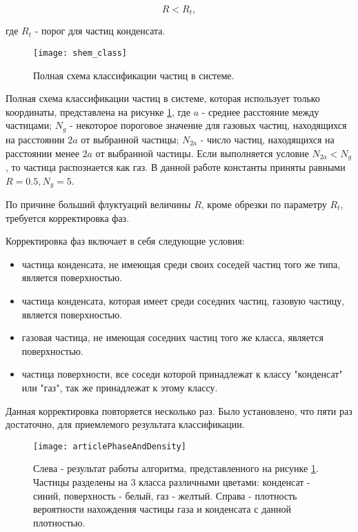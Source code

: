 \begin{equation}
R < R_t,
\end{equation}

где $R_t$ - порог для частиц конденсата.

\begin{figure}[h]
\begin{center}
\texttt{[image: shem\_class]}
\caption{Полная схема классификации частиц в системе.}
\label{risShemClass}
\end{center}
\end{figure}

Полная схема классификации частиц в системе, которая использует только координаты, представлена на рисунке \ref{risShemClass},
где $a$ - среднее расстояние между частицами; $N_g$ - некоторое пороговое значение для газовых частиц, находящихся на расстоянии $2a$ от выбранной частицы; $N_{2a}$ - число частиц, находящихся на расстоянии менее $2a$ от выбранной частицы. Если выполняется условие $N_{2a} < N_{g}$, то частица распознается как газ.
В данной работе константы приняты равными $R = 0.5, N_g = 5$.


По причине больший флуктуаций величины $R$, кроме обрезки по параметру $R_t$, требуется корректировка фаз.


Корректировка фаз включает в себя следующие условия:
\begin{itemize}
\item частица конденсата, не имеющая среди своих соседей частиц того же типа, является поверхностью.
\item частица конденсата, которая имеет среди соседних частиц, газовую частицу, является поверхностью.
\item газовая частица, не имеющая соседних частиц того же класса,  является поверхностью.
\item частица поверхности, все соседи которой принадлежат к классу "конденсат" или "газ", так же принадлежат к этому классу.
\end{itemize}
Данная корректировка повторяется несколько раз. Было установлено, что пяти раз достаточно, для приемлемого результата классификации.

\begin{figure}[h]
\begin{center}
\texttt{[image: articlePhaseAndDensity]}
\caption{Слева - результат работы алгоритма, представленного на рисунке \ref{risShemClass}. Частицы разделены на 3 класса различными цветами: конденсат - синий, поверхность - белый, газ - желтый. Справа - плотность вероятности нахождения частицы газа и конденсата с данной плотностью.}
\label{risClassification}
\end{center}
\end{figure}

